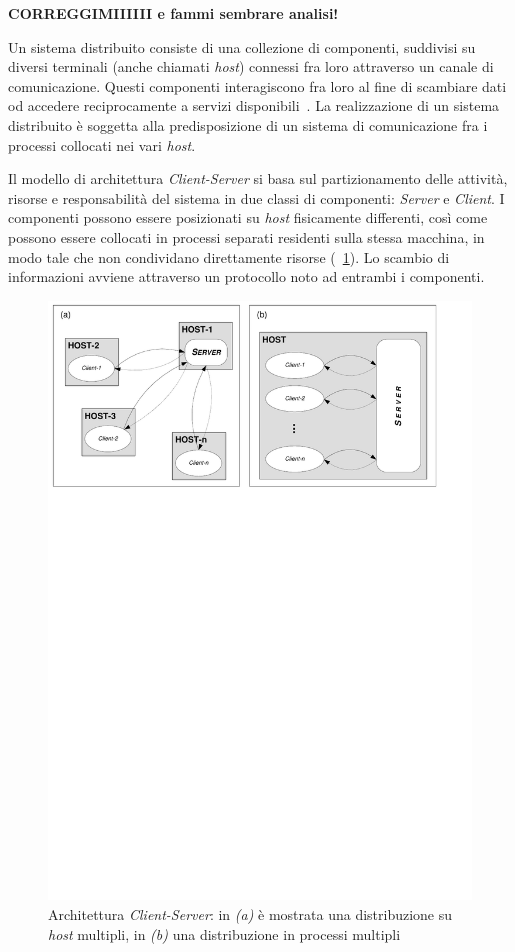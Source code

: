 \textbf{CORREGGIMIIIIII e fammi sembrare analisi!}

Un sistema distribuito consiste di una collezione di componenti, suddivisi su diversi terminali (anche chiamati \emph{host}) connessi fra loro attraverso un canale di comunicazione. Questi componenti interagiscono fra loro al fine di scambiare dati od accedere reciprocamente a servizi disponibili~\cite{Mascolo:2002:MCM:770420.770423}.
La realizzazione di un sistema distribuito è soggetta alla predisposizione di un sistema di comunicazione fra i processi collocati nei vari \emph{host}.

Il modello di architettura \emph{Client-Server} si basa sul partizionamento delle attività, risorse e responsabilità del sistema in due classi di componenti: \emph{Server} e \emph{Client}.
I componenti possono essere posizionati su \emph{host} fisicamente differenti, così come possono essere collocati in processi separati residenti sulla stessa macchina, in modo tale che non condividano direttamente risorse (\figurename~\ref{fig:client-server}). Lo scambio di informazioni avviene attraverso un protocollo noto ad entrambi i componenti.

\begin{figure}[h]
\centering
\includegraphics[scale=0.7, viewport=6 582 546 838]{Immagini/Capitolo2/Client-Server.pdf}
\caption[Architettura \emph{Client-Server}]{Architettura \emph{Client-Server}: in \emph{(a)} è mostrata una distribuzione su \emph{host} multipli, in \emph{(b)} una distribuzione in processi multipli}\label{fig:client-server}
\end{figure}

